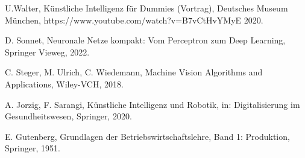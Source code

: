 \begin{thebibliography}{99}
	U.Walter,
	Künstliche Intelligenz für Dummies (Vortrag),
	Deutsches Museum München,
	https://www.youtube.com/watch?v=B7vCtHvYMyE
	2020.

	D. Sonnet,
	Neuronale Netze kompakt: Vom Perceptron zum Deep Learning,
	Springer Vieweg,
	2022.

	C. Steger, M. Ulrich, C. Wiedemann,
	Machine Vision Algorithms and Applications,
	Wiley-VCH,
	2018.

	A. Jorzig, F. Sarangi,
	Künstliche Intelligenz und Robotik, 
	in: Digitalisierung im Gesundheitswesen,
	Springer,
	2020.

	E. Gutenberg,
	Grundlagen der Betriebswirtschaftslehre, Band 1: Produktion,
	Springer,
	1951.




\end{thebibliography}